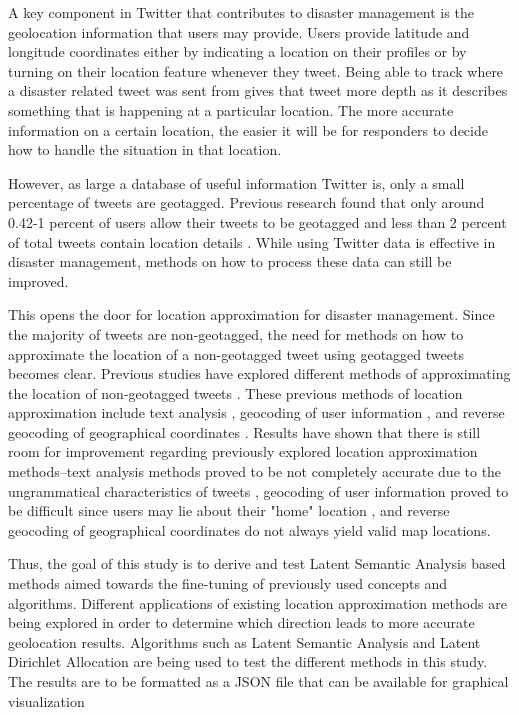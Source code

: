 A key component in Twitter that contributes to disaster management is the geolocation information that users may provide. Users provide latitude and longitude coordinates either by indicating a location on their profiles or by turning on their location feature whenever they tweet. Being able to track where a disaster related tweet was sent from gives that tweet more depth as it describes something that is happening at a particular location. The more accurate information on a certain location, the easier it will be for responders to decide how to handle the situation in that location.

However, as large a database of useful information Twitter is, only a small percentage of tweets are geotagged. Previous research found that only around 0.42-1 percent of users allow their tweets to be geotagged \cite{CHENGCAVARLEELEE2010, MAHMUDNICHOLSDREWS2014} and less than 2 percent of total tweets contain location details \cite{LAYLAVIRAJABIFARDKALANTARI2016}. While using Twitter data is effective in disaster management, methods on how to process these data can still be improved.

This opens the door for location approximation for disaster management. Since the majority of tweets are non-geotagged, the need for methods on how to approximate the location of a non-geotagged tweet using geotagged tweets becomes clear. Previous studies have explored different methods of approximating the location of non-geotagged tweets \cite{OBCS2013, GFC2012,carmen,ROSALES2017, VELASCOBERMEJODOMINGO2018}. These previous methods of location approximation include text analysis \cite{ROSALES2017, VELASCOBERMEJODOMINGO2018}, geocoding of user information \cite{OBCS2013, GFC2012, carmen}, and reverse geocoding of geographical coordinates \cite{ROSALES2017, VELASCOBERMEJODOMINGO2018}. Results have shown that there is still room for improvement regarding previously explored location approximation methods--text analysis methods proved to be not completely accurate due to the ungrammatical characteristics of tweets \cite{ROSALES2017, VELASCOBERMEJODOMINGO2018}, geocoding of user information proved to be difficult since users may lie about their "home" location \cite{OBCS2013, GFC2012}, and reverse geocoding of geographical coordinates do not always yield valid map locations.   

Thus, the goal of this study is to derive and test Latent Semantic Analysis based methods aimed towards the fine-tuning of previously used concepts and algorithms. Different applications of existing location approximation methods are being explored in order to determine which direction leads to more accurate geolocation results. Algorithms such as Latent Semantic Analysis and Latent Dirichlet Allocation are being used to test the different methods in this study. The results are to be formatted as a JSON file that can be available for graphical visualization